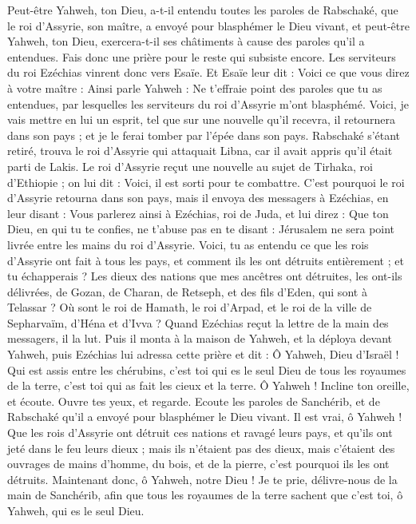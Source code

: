 \begin{multicols}{2}
Peut-être Yahweh, ton Dieu, a-t-il entendu toutes les paroles de Rabschaké, que le roi d’Assyrie, son maître, a envoyé pour blasphémer le Dieu vivant, et peut-être Yahweh, ton Dieu, exercera-t-il ses châtiments à cause des paroles qu’il a entendues. Fais donc une prière pour le reste qui subsiste encore.
Les serviteurs du roi Ezéchias vinrent donc vers Esaïe.
Et Esaïe leur dit : Voici ce que vous direz à votre maître : Ainsi parle Yahweh : Ne t’effraie point des paroles que tu as entendues, par lesquelles les serviteurs du roi d’Assyrie m’ont blasphémé.
Voici, je vais mettre en lui un esprit, tel que sur une nouvelle qu’il recevra, il retournera dans son pays ; et je le ferai tomber par l’épée dans son pays.
Rabschaké s’étant retiré, trouva le roi d’Assyrie qui attaquait Libna, car il avait appris qu’il était parti de Lakis.
Le roi d’Assyrie reçut une nouvelle au sujet de Tirhaka, roi d’Ethiopie ; on lui dit : Voici, il est sorti pour te combattre. C’est pourquoi le roi d’Assyrie retourna dans son pays, mais il envoya des messagers à Ezéchias, en leur disant :
Vous parlerez ainsi à Ezéchias, roi de Juda, et lui direz : Que ton Dieu, en qui tu te confies, ne t’abuse pas en te disant : Jérusalem ne sera point livrée entre les mains du roi d’Assyrie.
Voici, tu as entendu ce que les rois d’Assyrie ont fait à tous les pays, et comment ils les ont détruits entièrement ; et tu échapperais ?
Les dieux des nations que mes ancêtres ont détruites, les ont-ils délivrées, de Gozan, de Charan, de Retseph, et des fils d’Eden, qui sont à Telassar ?
Où sont le roi de Hamath, le roi d’Arpad, et le roi de la ville de Sepharvaïm, d’Héna et d’Ivva ?
Quand Ezéchias reçut la lettre de la main des messagers, il la lut. Puis il monta à la maison de Yahweh, et la déploya devant Yahweh,
puis Ezéchias lui adressa cette prière et dit : Ô Yahweh, Dieu d’Israël ! Qui est assis entre les chérubins, c’est toi qui es le seul Dieu de tous les royaumes de la terre, c’est toi qui as fait les cieux et la terre.
Ô Yahweh ! Incline ton oreille, et écoute. Ouvre tes yeux, et regarde. Ecoute les paroles de Sanchérib, et de Rabschaké qu’il a envoyé pour blasphémer le Dieu vivant.
Il est vrai, ô Yahweh ! Que les rois d’Assyrie ont détruit ces nations et ravagé leurs pays,
et qu’ils ont jeté dans le feu leurs dieux ; mais ils n’étaient pas des dieux, mais c’étaient des ouvrages de mains d’homme, du bois, et de la pierre, c’est pourquoi ils les ont détruits.
Maintenant donc, ô Yahweh, notre Dieu ! Je te prie, délivre-nous de la main de Sanchérib, afin que tous les royaumes de la terre sachent que c’est toi, ô Yahweh, qui es le seul Dieu.

\end{multicols}

